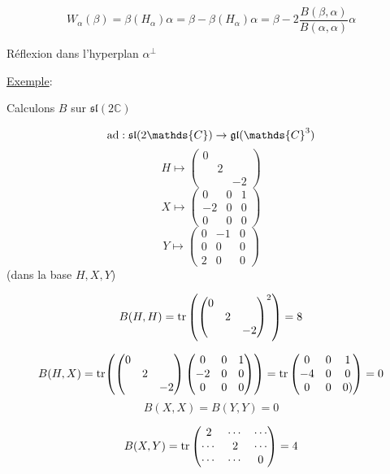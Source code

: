 \[ W_{\alpha} (\beta ) = \beta (H_{\alpha} ) \alpha = \beta - \beta(H_{\alpha} ) \alpha = \beta - 2 \frac{B(\beta , \alpha) }{B (\alpha , \alpha ) } \alpha   \]

Réflexion dans l'hyperplan \(\alpha^{\perp}\)


\underline{Exemple}:

Calculons \(B\) sur \(\mathfrak{sl}(2 \mathds{C})\)

\[ {\rm{}ad}: \mathfrak{sl}(2 \mathds{C}) \to \mathfrak{gl}(\mathds{C}^3)  \]
\[ H \mapsto \begin{pmatrix} 0 & & \\ & 2 & \\ &&-2 \end{pmatrix}  \]
\[ X \mapsto \begin{pmatrix} 0 & 0 & 1 \\ -2& 0 & 0\\ 0&0&0 \end{pmatrix}  \]
\[ Y \mapsto \begin{pmatrix} 0 & -1 & 0 \\ 0& 0 & 0\\ 2&0&0 \end{pmatrix}  \]
(dans la base \(H, X, Y\))

\[ B(H,H) = \tr \left( \begin{pmatrix} 0 \\ & 2 \\ && -2 \end{pmatrix}^2 \right) = 8  \]

\[ B(H,X) = \tr(\begin{pmatrix} 0 \\ & 2 \\ &&-2 \end{pmatrix} \begin{pmatrix} 0 &0 &1 \\ -2 &0 &0 \\0 &0 &0 \end{pmatrix} ) = \tr \begin{pmatrix} 0 &0 & 1 \\ -4 & 0 &0 \\ 0 &0 &0) \end{pmatrix} = 0 \]
\[ B(X,X) = B(Y,Y) = 0 \]

\[ B(X,Y) = \tr\begin{pmatrix}2 & \dotsb & \dotsb \\ \dotsb & 2 & \dotsb \\ \dotsb & \dotsb & 0\end{pmatrix} =4 \]

